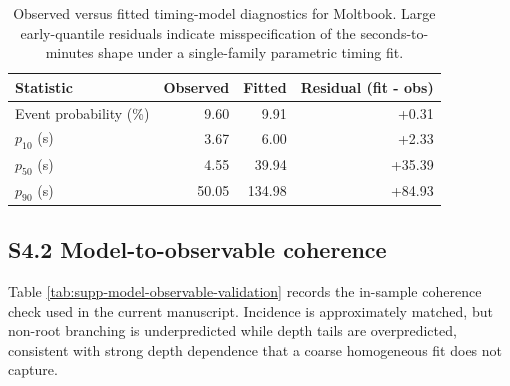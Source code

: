 \begin{table}[h]
\centering
\caption{Observed versus fitted timing-model diagnostics for Moltbook. Large
early-quantile residuals indicate misspecification of the seconds-to-minutes
shape under a single-family parametric timing fit.}
\label{tab:supp-timing-model-fit}
\small
\begin{tabular}{@{}lrrr@{}}
\toprule
\textbf{Statistic} & \textbf{Observed} & \textbf{Fitted} & \textbf{Residual (fit - obs)} \\
\midrule
Event probability (\%) & 9.60 & 9.91 & +0.31 \\
\(p_{10}\) (s) & 3.67 & 6.00 & +2.33 \\
\(p_{50}\) (s) & 4.55 & 39.94 & +35.39 \\
\(p_{90}\) (s) & 50.05 & 134.98 & +84.93 \\
\bottomrule
\end{tabular}
\end{table}

\subsection*{S4.2 Model-to-observable coherence}

Table \ref{tab:supp-model-observable-validation} records the in-sample
coherence check used in the current manuscript. Incidence is approximately
matched, but non-root branching is underpredicted while depth tails are
overpredicted, consistent with strong depth dependence that a coarse homogeneous
fit does not capture.

